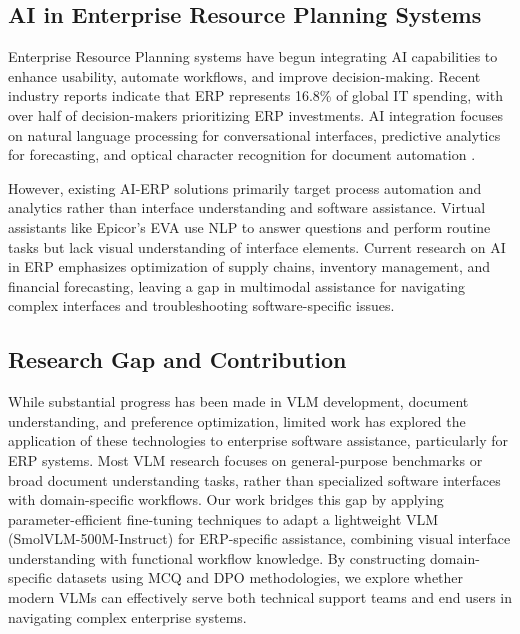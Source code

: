 \documentclass[10pt,conference,compsocconf]{IEEEtran}
\begin{document}
\subsection{AI in Enterprise Resource Planning Systems}

Enterprise Resource Planning systems have begun integrating AI capabilities to enhance usability, automate workflows, and improve decision-making. Recent industry reports \cite{hginsights2024} indicate that ERP represents 16.8\% of global IT spending, with over half of decision-makers prioritizing ERP investments. AI integration focuses on natural language processing for conversational interfaces, predictive analytics for forecasting, and optical character recognition for document automation \cite{epicor2024eva} \cite{microsoft2024dynamics}.

However, existing AI-ERP solutions primarily target process automation and analytics rather than interface understanding and software assistance. Virtual assistants like Epicor's EVA \cite{epicor2024eva} use NLP to answer questions and perform routine tasks but lack visual understanding of interface elements. Current research on AI in ERP \cite{jawad2024mldriven} emphasizes optimization of supply chains, inventory management, and financial forecasting, leaving a gap in multimodal assistance for navigating complex interfaces and troubleshooting software-specific issues.

\subsection{Research Gap and Contribution}

While substantial progress has been made in VLM development, document understanding, and preference optimization, limited work has explored the application of these technologies to enterprise software assistance, particularly for ERP systems. Most VLM research focuses on general-purpose benchmarks or broad document understanding tasks, rather than specialized software interfaces with domain-specific workflows. Our work bridges this gap by applying parameter-efficient fine-tuning techniques to adapt a lightweight VLM (SmolVLM-500M-Instruct) for ERP-specific assistance, combining visual interface understanding with functional workflow knowledge. By constructing domain-specific datasets using MCQ and DPO methodologies, we explore whether modern VLMs can effectively serve both technical support teams and end users in navigating complex enterprise systems.
\end{document}
